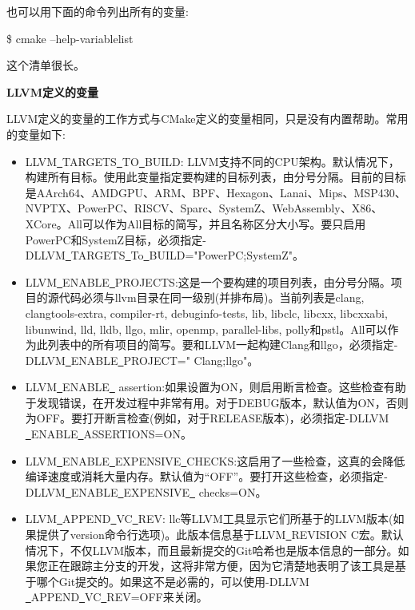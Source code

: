 也可以用下面的命令列出所有的变量:\par

\begin{tcolorbox}[colback=white,colframe=black]
	\$ cmake --help-variablelist
\end{tcolorbox}

这个清单很长。\par


\hspace*{\fill} \par %
\textbf{LLVM定义的变量}

LLVM定义的变量的工作方式与CMake定义的变量相同，只是没有内置帮助。常用的变量如下:\par

\begin{itemize}
	\item LLVM\underline{~}TARGETS\underline{~}TO\underline{~}BUILD: LLVM支持不同的CPU架构。默认情况下，构建所有目标。使用此变量指定要构建的目标列表，由分号分隔。目前的目标是AArch64、AMDGPU、ARM、BPF、Hexagon、Lanai、Mips、MSP430、NVPTX、PowerPC、RISCV、Sparc、SystemZ、WebAssembly、X86、XCore。All可以作为All目标的简写，并且名称区分大小写。要只启用PowerPC和SystemZ目标，必须指定-DLLVM\underline{~}TARGETS\underline{~}To\underline{~}BUILD="PowerPC;SystemZ"。
	
	\item LLVM\underline{~}ENABLE\underline{~}PROJECTS:这是一个要构建的项目列表，由分号分隔。项目的源代码必须与llvm目录在同一级别(并排布局)。当前列表是clang, clangtools-extra, compiler-rt, debuginfo-tests, lib, libclc, libcxx, libcxxabi, libunwind, lld, lldb, llgo, mlir, openmp, parallel-libs, polly和pstl。All可以作为此列表中的所有项目的简写。要和LLVM一起构建Clang和llgo，必须指定-DLLVM\underline{~}ENABLE\underline{~}PROJECT=" Clang;llgo"。
	
	\item LLVM\underline{~}ENABLE\underline{~} assertion:如果设置为ON，则启用断言检查。这些检查有助于发现错误，在开发过程中非常有用。对于DEBUG版本，默认值为ON，否则为OFF。要打开断言检查(例如，对于RELEASE版本)，必须指定-DLLVM \underline{~}ENABLE\underline{~}ASSERTIONS=ON。
	
	\item LLVM\underline{~}ENABLE\underline{~}EXPENSIVE\underline{~}CHECKS:这启用了一些检查，这真的会降低编译速度或消耗大量内存。默认值为“OFF”。要打开这些检查，必须指定-DLLVM\underline{~}ENABLE\underline{~}EXPENSIVE\underline{~} checks=ON。
	
	\item LLVM\underline{~}APPEND\underline{~}VC\underline{~}REV: llc等LLVM工具显示它们所基于的LLVM版本(如果提供了version命令行选项)。此版本信息基于LLVM\underline{~}REVISION C宏。默认情况下，不仅LLVM版本，而且最新提交的Git哈希也是版本信息的一部分。如果您正在跟踪主分支的开发，这将非常方便，因为它清楚地表明了该工具是基于哪个Git提交的。如果这不是必需的，可以使用-DLLVM \underline{~}APPEND\underline{~}VC\underline{~}REV=OFF来关闭。
	

\end{itemize}
